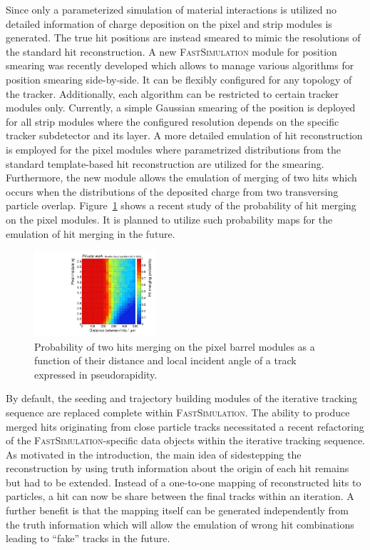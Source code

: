 \documentclass[a4paper]{jpconf}
\begin{document}
Since only a parameterized simulation of material interactions is utilized no detailed information of charge deposition on the pixel and strip modules is generated. The true hit positions are instead smeared to mimic the resolutions of the standard hit reconstruction. A new \textsc{FastSimulation} module for position smearing was recently developed which allows to manage various algorithms for position smearing side-by-side. It can be flexibly configured for any topology of the tracker. Additionally, each algorithm can be restricted to certain tracker modules only. Currently, a simple Gaussian smearing of the position is deployed for all strip modules where the configured resolution depends on the specific tracker subdetector and its layer. A more detailed emulation of hit reconstruction is employed for the pixel modules where parametrized distributions from the standard template-based hit reconstruction are utilized for the smearing. Furthermore, the new module allows the emulation of merging of two hits which occurs when the distributions of the deposited charge from two transversing particle overlap. Figure~\ref{fig:merge} shows a recent study of the probability of hit merging on the pixel modules. It is planned to utilize such probability maps for the emulation of hit merging in the future.

\begin{figure}[htbp]
\begin{center}
\includegraphics[width=0.4\textwidth]{figures/merge.pdf}
\caption{\label{fig:merge}Probability of two hits merging on the pixel barrel modules as a function of their distance and local incident angle of a track expressed in pseudorapidity.}
\end{center}
\end{figure}

By default, the seeding and trajectory building modules of the iterative tracking sequence are replaced complete within \textsc{FastSimulation}. The ability to produce merged hits originating from close particle tracks necessitated a recent refactoring of the \textsc{FastSimulation}-specific data objects within the iterative tracking sequence. As motivated in the introduction, the main idea of sidestepping the reconstruction by using truth information about the origin of each hit remains but had to be extended. Instead of a one-to-one mapping of reconstructed hits to particles, a hit can now be share between the final tracks within an iteration. A further benefit is that the mapping itself can be generated independently from the truth information which will allow the emulation of wrong hit combinations leading to ``fake'' tracks in the future.
\end{document}
